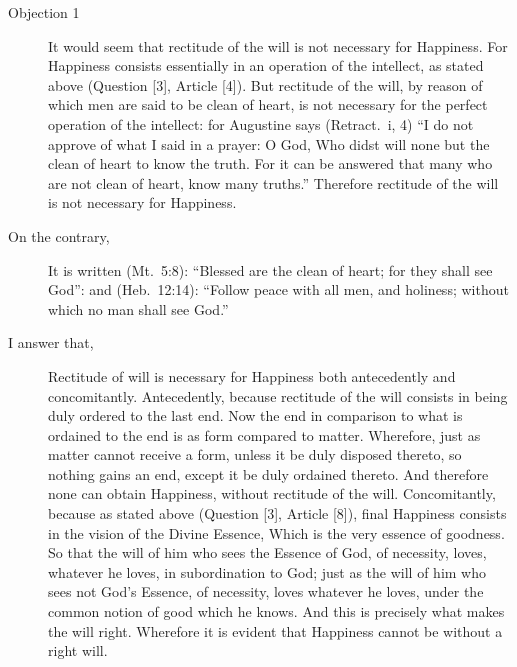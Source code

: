 \documentclass[10pt,article,twoside]{memoir}
\begin{document}
\begin{multicols}{2}
	\begin{description}
		\item[Objection 1]%
		It would seem that rectitude of the will is not necessary for Happiness. For Happiness consists essentially in an operation of the intellect,%
		as stated above (Question [3], Article [4]). But rectitude of the will, by reason of which men are said to be clean of heart, is not necessary for the perfect operation of the intellect: for Augustine says (Retract.~i, 4) ``I do not approve of what I said in a prayer: O God, Who didst will none but the clean of heart to know the truth. For it can be answered that many who are not clean of heart, know many truths.'' Therefore rectitude of the will is not necessary for Happiness.
		\item[On the contrary,] It is written (Mt.~5:8): ``Blessed are the clean of heart; for they shall see God'': and (Heb.~12:14): ``Follow peace with all men, and holiness; without which no man shall see God.''
		\item[I answer that,] Rectitude of will is necessary for Happiness both antecedently and concomitantly. Antecedently, because rectitude of the will consists in being duly ordered to the last end. Now the end in comparison to what is ordained to the end is as form compared to matter. Wherefore, just as matter cannot receive a form, unless it be duly disposed thereto, so nothing gains an end, except it be duly ordained thereto. And therefore none can obtain Happiness, without rectitude of the will. Concomitantly, because as stated above (Question [3], Article [8]), final Happiness consists in the vision of the Divine Essence, Which is the very essence of goodness. So that the will of him who sees the Essence of God, of necessity, loves, whatever he loves, in subordination to God; just as the will of him who sees not God's Essence, of necessity, loves whatever he loves, under the common notion of good which he knows. And this is precisely what makes the will right. Wherefore it is evident that Happiness cannot be without a right will.
	\end{description}
	

\end{multicols}
\end{document}
